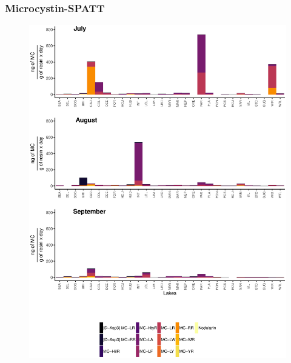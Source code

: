 \begin{frame}
	\frametitle{Microcystin-SPATT}

	\begin{figure}
		\includegraphics[width=\textwidth,height=1.04\textheight]{1spatter.eps}
	\end{figure}
\end{frame}

